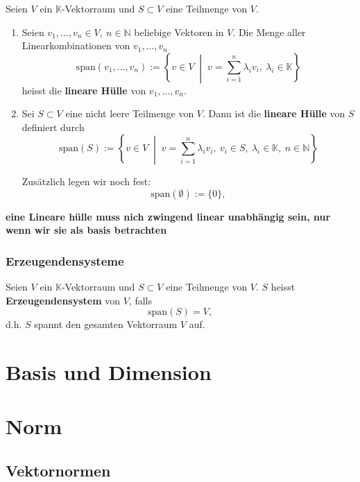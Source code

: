 \documentclass[9pt,a4paper]{article}
\begin{document}
    Seien $V$ ein $\mathbb{K}$-Vektorraum und $S \subset V$ eine Teilmenge von $V$.
    
    \begin{enumerate}
    	\item[i)] Seien $v_1, \ldots, v_n \in V,\ n \in \mathbb{N}$ beliebige Vektoren in $V$. 
    	Die Menge aller Linearkombinationen von $v_1, \ldots, v_n$
    	\[
    	\text{span}(v_1, \ldots, v_n) := \left\{ v \in V \;\middle|\; v = \sum_{i=1}^{n} \lambda_i v_i,\ \lambda_i \in \mathbb{K} \right\}
    	\]
    	heisst die \textbf{lineare Hülle} von $v_1, \ldots, v_n$.
    	
    	\item[ii)] Sei $S \subset V$ eine nicht leere Teilmenge von $V$. 
    	Dann ist die \textbf{lineare Hülle} von $S$ definiert durch
    	\[
    	\text{span}(S) := \left\{ v \in V \;\middle|\; v = \sum_{i=1}^{n} \lambda_i v_i,\ v_i \in S,\ \lambda_i \in \mathbb{K},\ n \in \mathbb{N} \right\}
    	\]
    	
    	Zusätzlich legen wir noch fest:
    	\[
    	\text{span}(\emptyset) := \{0\},
    	\]
    \end{enumerate}
    
    \textbf{eine Lineare hülle muss nich zwingend linear unabhängig sein, nur wenn wir sie als basis betrachten}
    
    \subsubsection{Erzeugendensysteme}
    
    Seien $V$ ein $\mathbb{K}$-Vektorraum und $S \subset V$ eine Teilmenge von $V$. 
    $S$ heisst \textbf{Erzeugendensystem} von $V$, falls
    \[
    \text{span}(S) = V,
    \]
    d.h. $S$ spannt den gesamten Vektorraum $V$ auf.
    
    \section{Basis und Dimension}
    
    \section{Norm}
    
    \subsection{Vektornormen}
    
\end{document}
